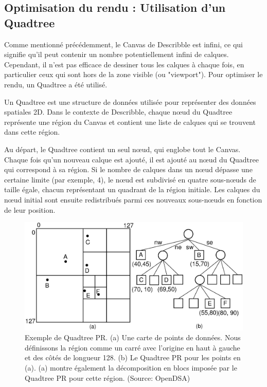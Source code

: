 \subsection{Optimisation du rendu : Utilisation d'un Quadtree}

Comme mentionné précédemment, le Canvas de Describble est infini, ce qui signifie qu'il peut contenir un nombre potentiellement infini de calques. Cependant, il n'est pas efficace de dessiner tous les calques à chaque fois, en particulier ceux qui sont hors de la zone visible (ou "viewport"). Pour optimiser le rendu, un Quadtree a été utilisé.

Un Quadtree est une structure de données utilisée pour représenter des données spatiales 2D. Dans le contexte de Describble, chaque nœud du Quadtree représente une région du Canvas et contient une liste de calques qui se trouvent dans cette région.

Au départ, le Quadtree contient un seul nœud, qui englobe tout le Canvas. Chaque fois qu'un nouveau calque est ajouté, il est ajouté au nœud du Quadtree qui correspond à sa région. Si le nombre de calques dans un nœud dépasse une certaine limite (par exemple, 4), le nœud est subdivisé en quatre sous-nœuds de taille égale, chacun représentant un quadrant de la région initiale. Les calques du nœud initial sont ensuite redistribués parmi ces nouveaux sous-nœuds en fonction de leur position.

\begin{figure}[H]
    \centering
    \includegraphics[width=\textwidth]{assets/figures/quadtree.png}
    \caption{Exemple de Quadtree PR. (a) Une carte de points de données. Nous définissons la région comme un carré avec l'origine en haut à gauche et des côtés de longueur 128. (b) Le Quadtree PR pour les points en (a). (a) montre également la décomposition en blocs imposée par le Quadtree PR pour cette région. (Source: OpenDSA\cite{opendsaprojectPRQuadtreeData})}
    \label{fig:quadtree}
\end{figure}

